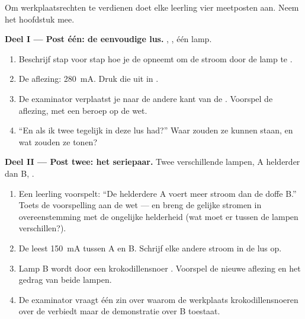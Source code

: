 \begin{problem}\label{pb:g8:intensity-ammeter:1}
Om werkplaatsrechten te verdienen doet elke leerling vier meetposten
aan. Neem het hoofdstuk mee.

\medskip\noindent\textbf{Deel I --- Post één: de eenvoudige lus.}
, , één lamp.
\begin{enumerate}
  \item Beschrijf stap voor stap hoe je de  opneemt
        om de stroom door de lamp te .
  \item De aflezing: \qty{280}{mA}. Druk die uit in
        .
  \item De examinator verplaatst je  naar de andere kant van de
        . Voorspel de aflezing, met een beroep op de
        wet.
  \item ``En als ik twee  tegelijk in deze lus had?''
        Waar zouden ze kunnen staan, en wat zouden ze tonen?
\end{enumerate}

\medskip\noindent\textbf{Deel II --- Post twee: het seriepaar.}
Twee verschillende lampen, A helderder dan B, .
\begin{enumerate}[resume]
  \item Een leerling voorspelt: ``De helderdere A voert meer stroom
        dan de doffe B.'' Toets de voorspelling aan de wet --- en
        breng de gelijke stromen in overeenstemming met de ongelijke
        helderheid (wat moet er tussen de lampen verschillen?).
  \item De  leest \qty{150}{mA} tussen A en B. Schrijf elke
        andere stroom in de lus op.
  \item Lamp B wordt door een krokodillensnoer
        . Voorspel de nieuwe aflezing en het gedrag
        van beide lampen.
  \item De examinator vraagt één zin over waarom de werkplaats
        krokodillensnoeren over de \emph{} verbiedt maar de
        demonstratie over B toestaat.
\end{enumerate}


\end{problem}
